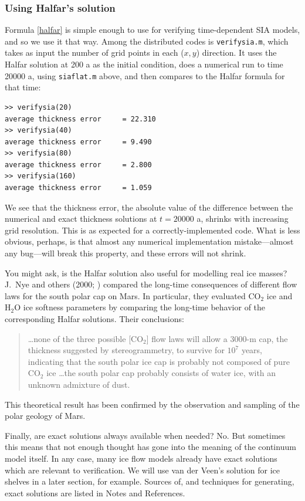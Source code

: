 \documentclass[titlepage,a4paper,final,12pt]{scrartcl}
\begin{document}
\subsubsection*{Using Halfar's solution}  Formula \eqref{halfar} is simple enough to use for verifying time-dependent SIA models, and so we use it that way.  Among the distributed codes is \texttt{verifysia.m}, which takes as input the number of grid points in each ($x,y$) direction.  It uses the Halfar solution at 200 a as the initial condition, does a numerical run to time 20000 a, using \texttt{siaflat.m} above, and then compares to the Halfar formula for that time:
\small
\begin{verbatim}
>> verifysia(20)
average thickness error     = 22.310
>> verifysia(40)
average thickness error     = 9.490
>> verifysia(80)
average thickness error     = 2.800
>> verifysia(160)
average thickness error     = 1.059
\end{verbatim}
\normalsize
We see that the thickness error, the absolute value of the difference between the numerical and exact thickness solutions at $t=20000$ a, shrinks with increasing grid resolution.  This is as expected for a correctly-implemented code.  What is less obvious, perhaps, is that almost any numerical implementation mistake---almost any bug---will break this property, and these errors will not shrink.

You might ask, is the Halfar solution also useful for modelling real ice masses?  J.~Nye and others (2000; \cite{NyeIcarus2000}) compared the long-time consequences of different flow laws for the south polar cap on Mars.  In particular, they evaluated $\text{CO}_2$ ice and $\text{H}_2\text{O}$ ice softness parameters by comparing the long-time behavior of the corresponding Halfar solutions.  Their conclusions:
  \begin{quote}
  \dots none of the three possible [$\text{CO}_2$] flow laws will allow a 3000-m cap, the thickness suggested by stereogrammetry, to survive for $10^7$ years, indicating that the south polar ice cap is probably not composed of pure $\text{CO}_2$ ice \dots the south polar cap probably consists of water ice, with an unknown admixture of dust.
  \end{quote}
This theoretical result has been confirmed by the observation and sampling of the polar geology of Mars.

Finally, are exact solutions always available when needed?  No.  But sometimes this means that not enough thought has gone into the meaning of the continuum model itself.  In any case, many ice flow models already have exact solutions which are relevant to verification.  We will use van der Veen's solution for ice shelves in a later section, for example.  Sources of, and techniques for generating, exact solutions are listed in Notes and References.
\end{document}
